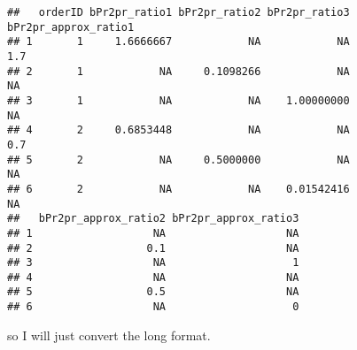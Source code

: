 \documentclass[10pt]{report}
\newenvironment{Shaded}{}{}
\newcommand{\KeywordTok}[1]{\textcolor[rgb]{0.00,0.44,0.13}{\textbf{{#1}}}}
\newcommand{\DataTypeTok}[1]{\textcolor[rgb]{0.56,0.13,0.00}{{#1}}}
\newcommand{\DecValTok}[1]{\textcolor[rgb]{0.25,0.63,0.44}{{#1}}}
\newcommand{\StringTok}[1]{\textcolor[rgb]{0.25,0.44,0.63}{{#1}}}
\newcommand{\NormalTok}[1]{{#1}}
\begin{document}
\begin{Shaded}
\end{Shaded}

\begin{verbatim}
##   orderID bPr2pr_ratio1 bPr2pr_ratio2 bPr2pr_ratio3 bPr2pr_approx_ratio1
## 1       1     1.6666667            NA            NA                  1.7
## 2       1            NA     0.1098266            NA                   NA
## 3       1            NA            NA    1.00000000                   NA
## 4       2     0.6853448            NA            NA                  0.7
## 5       2            NA     0.5000000            NA                   NA
## 6       2            NA            NA    0.01542416                   NA
##   bPr2pr_approx_ratio2 bPr2pr_approx_ratio3
## 1                   NA                   NA
## 2                  0.1                   NA
## 3                   NA                    1
## 4                   NA                   NA
## 5                  0.5                   NA
## 6                   NA                    0
\end{verbatim}

so I will just convert the long format.

\begin{Shaded}
\end{Shaded}
\end{document}
